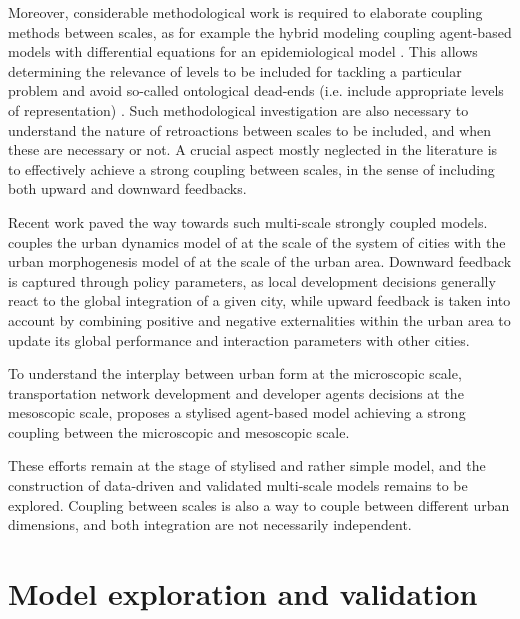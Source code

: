Moreover, considerable methodological work is required to elaborate coupling methods between scales, as for example the hybrid modeling coupling agent-based models with differential equations for an epidemiological model \cite{banos2015coupling}. This allows determining the relevance of levels to be included for tackling a particular problem and avoid so-called ontological dead-ends (i.e. include appropriate levels of representation) \cite{roth2006reconstruction}. Such methodological investigation are also necessary to understand the nature of retroactions between scales to be included, and when these are necessary or not. A crucial aspect mostly neglected in the literature is to effectively achieve a strong coupling between scales, in the sense of including both upward and downward feedbacks.



Recent work paved the way towards such multi-scale strongly coupled models. \cite{raimbault2021strong} couples the urban dynamics model of \cite{raimbault2020indirect} at the scale of the system of cities with the urban morphogenesis model of \cite{raimbault2018calibration} at the scale of the urban area. Downward feedback is captured through policy parameters, as local development decisions generally react to the global integration of a given city, while upward feedback is taken into account by combining positive and negative externalities within the urban area to update its global performance and interaction parameters with other cities.

To understand the interplay between urban form at the microscopic scale, transportation network development and developer agents decisions at the mesoscopic scale, \cite{raimbault2021multiscale} proposes a stylised agent-based model achieving a strong coupling between the microscopic and mesoscopic scale.

These efforts remain at the stage of stylised and rather simple model, and the construction of data-driven and validated multi-scale models remains to be explored. Coupling between scales is also a way to couple between different urban dimensions, and both integration are not necessarily independent.


\section{Model exploration and validation}


